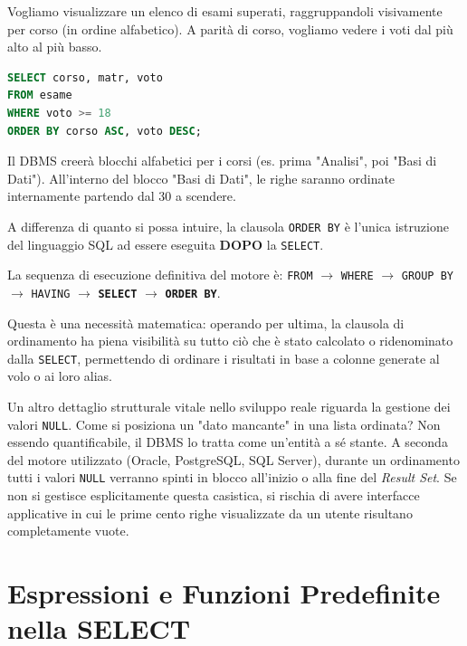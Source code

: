 \begin{example}
Vogliamo visualizzare un elenco di esami superati, raggruppandoli visivamente per corso (in ordine alfabetico). A parità di corso, vogliamo vedere i voti dal più alto al più basso.

\begin{lstlisting}[language=SQL, basicstyle=\ttfamily\small, keywordstyle=\color{blue}\bfseries]
SELECT corso, matr, voto
FROM esame
WHERE voto >= 18
ORDER BY corso ASC, voto DESC;
\end{lstlisting}
Il DBMS creerà blocchi alfabetici per i corsi (es. prima "Analisi", poi "Basi di Dati"). All'interno del blocco "Basi di Dati", le righe saranno ordinate internamente partendo dal 30 a scendere.
\end{example}

\begin{warningbox}
A differenza di quanto si possa intuire, la clausola \texttt{ORDER BY} è l'unica istruzione del linguaggio SQL ad essere eseguita \textbf{DOPO} la \texttt{SELECT}. 

La sequenza di esecuzione definitiva del motore è:
\texttt{FROM} $\rightarrow$ \texttt{WHERE} $\rightarrow$ \texttt{GROUP BY} $\rightarrow$ \texttt{HAVING} $\rightarrow$ \textbf{\texttt{SELECT}} $\rightarrow$ \textbf{\texttt{ORDER BY}}.

Questa è una necessità matematica: operando per ultima, la clausola di ordinamento ha piena visibilità su tutto ciò che è stato calcolato o ridenominato dalla \texttt{SELECT}, permettendo di ordinare i risultati in base a colonne generate al volo o ai loro alias.

Un altro dettaglio strutturale vitale nello sviluppo reale riguarda la gestione dei valori \texttt{NULL}. Come si posiziona un "dato mancante" in una lista ordinata? Non essendo quantificabile, il DBMS lo tratta come un'entità a sé stante. A seconda del motore utilizzato (Oracle, PostgreSQL, SQL Server), durante un ordinamento tutti i valori \texttt{NULL} verranno spinti in blocco all'inizio o alla fine del \textit{Result Set}. Se non si gestisce esplicitamente questa casistica, si rischia di avere interfacce applicative in cui le prime cento righe visualizzate da un utente risultano completamente vuote.
\end{warningbox}

\section{Espressioni e Funzioni Predefinite nella SELECT}

